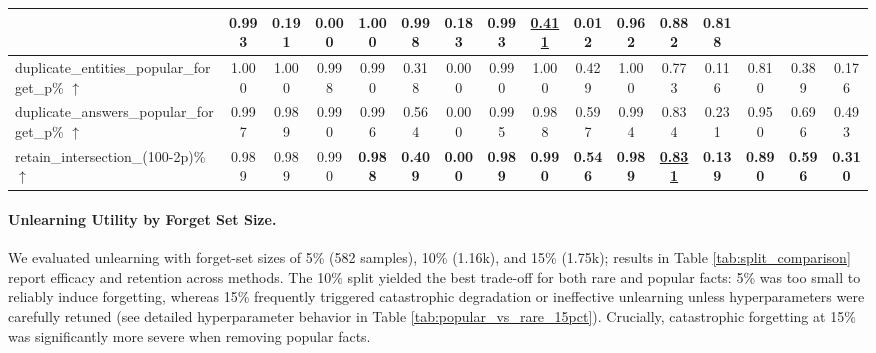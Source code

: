 \documentclass[11pt]{article}
\begin{document}
{\begin{table}[t]
{\begin{tabular}{l|ccc|ccc|ccc|ccc|ccc}
  & \textbf{0.993} & \textbf{0.191} & \textbf{0.000} 
  & \textbf{1.000} & \textbf{0.998} & \textbf{0.183} 
  & \textbf{0.993} & \textbf{\underline{0.411}} & \textbf{0.012} 
  & \textbf{0.962} & \textbf{0.882} & \textbf{0.818} \\
\hline
duplicate\_entities\_popular\_forget\_p\% $\uparrow$
  & 1.000 & 1.000 & 0.998 
  & 0.990 & 0.318 & 0.000 
  & 0.990 & 1.000 & 0.429 
  & 1.000 & 0.773 & 0.116 
  & 0.810 & 0.389 & 0.176 \\
\hline
duplicate\_answers\_popular\_forget\_p\% $\uparrow$
  & 0.997 & 0.989 & 0.990 
  & 0.996 & 0.564 & 0.000 
  & 0.995 & 0.988 & 0.597 
  & 0.994 & 0.834 & 0.231 
  & 0.950 & 0.696 & 0.493 \\
\hline
retain\_intersection\_{(100-2p)\%} $\uparrow$
  & 0.989 & 0.989 & 0.990 
  & \textbf{0.988} & \textbf{0.409} & \textbf{0.000} 
  & \textbf{0.989} & \textbf{0.990} & \textbf{0.546} 
  & \textbf{0.989} & \textbf{\underline{0.831}} & \textbf{0.139} 
  & \textbf{0.890} & \textbf{0.596} & \textbf{0.310} \\
\hline
\end{tabular}
}

\end{table}





\paragraph{Unlearning Utility by Forget Set Size.}
We evaluated unlearning with forget-set sizes of 5\% (582 samples), 10\% (1.16k), and 15\% (1.75k); results in Table \ref{tab:split_comparison} report efficacy and retention across methods. The 10\% split yielded the best trade-off for both rare and popular facts: 5\% was too small to reliably induce forgetting, whereas 15\% frequently triggered catastrophic degradation or ineffective unlearning unless hyperparameters were carefully retuned (see detailed hyperparameter behavior in Table \ref{tab:popular_vs_rare_15pct}). Crucially, catastrophic forgetting at 15\% was significantly more severe when removing popular facts.


}
\end{document}
